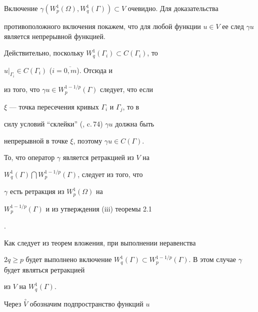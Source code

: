 \begin{pf}


Включение $\gamma (W_p^1(\Omega),


W_q^1(\Gamma)) \subset V$ очевидно. Для доказательства


противоположного включения покажем, что для любой функции $u \in


V$ ее след $\gamma u$ является непрерывной функцией.


Действительно, поскольку $W_q^1(\Gamma_i) \subset C(\Gamma_i)$, то


${u}|_{\Gamma_i} \in C(\Gamma_i)$ ($i=\overline{0,m}$). Отсюда и


из того, что $\gamma u \in W_p^{1-1/p}(\Gamma)$ следует, что если


$\xi$ --- точка пересечения кривых $\Gamma_i$ и $\Gamma_j$, то в


силу условий ``склейки'' (\cite{Jak}, c.\,74) $\gamma u$ должна быть


непрерывной в точке $\xi$, поэтому $\gamma u \in C(\Gamma)$.





То, что оператор $\gamma$ является ретракцией из $V$ на


$W_q^1(\Gamma)\bigcap W_p^{1-1/p}(\Gamma)$, следует из того, что


$\gamma$ есть ретракция из $W_p^1(\Omega)$ на


$W_p^{1-1/p}(\Gamma)$ и из утверждения (iii) теоремы 2.1


\cite{Timer}.


\end{pf}





\begin{notenonum}


Как следует из теорем вложения, при выполнении неравенства


$2q \geq p$ будет выполнено включение $W_q^1(\Gamma) \subset


W_p^{1-1/p}(\Gamma)$. В этом случае $\gamma$ будет являться ретракцией


из $V$ на $W_q^1(\Gamma)$.


\end{notenonum}








Через $\overset{\circ}{V}$ обозначим подпространство функций $u$


